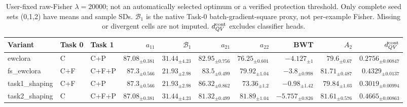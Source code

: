 \begin{table}[t]
\centering
\begin{tabular}{lllrrrrrrr}
\hline
Variant & Task 0 & Task 1 & $a_{11}$ & $\mathcal B_1$ & $a_{21}$ & $a_{22}$ & BWT & $A_2$ & $d_{QV}^{\rm cont}$ \\
\hline
ewclora & C & C+P & $87.08_{\pm 0.381}$ & $31.44_{\pm 4.23}$ & $82.95_{\pm 0.756}$ & $76.25_{\pm 0.601}$ & $-4.127_{\pm 1}$ & $79.6_{\pm 0.67}$ & $0.2756_{\pm 0.00847}$ \\
fs\_ewclora & C+F & C+F+P & $87.3_{\pm 0.566}$ & $21.93_{\pm 2.98}$ & $83.5_{\pm 0.499}$ & $79.92_{\pm 1.04}$ & $-3.8_{\pm 0.998}$ & $81.71_{\pm 0.487}$ & $0.4329_{\pm 0.0137}$ \\
task1\_shaping & C+F & C+P & $87.3_{\pm 0.566}$ & $21.93_{\pm 2.98}$ & $86.32_{\pm 0.862}$ & $73.36_{\pm 1.2}$ & $-0.98_{\pm 1.42}$ & $79.84_{\pm 1.03}$ & $0.3019_{\pm 0.00994}$ \\
task2\_shaping & C & C+F+P & $87.08_{\pm 0.381}$ & $31.44_{\pm 4.23}$ & $81.32_{\pm 0.499}$ & $81.89_{\pm 1.04}$ & $-5.757_{\pm 0.826}$ & $81.61_{\pm 0.576}$ & $0.4665_{\pm 0.00863}$ \\
\hline
\end{tabular}
\caption{User-fixed raw-Fisher $\lambda=20000$; not an automatically selected optimum or a verified protection threshold. Only complete seed sets (0,1,2) have means and sample SDs. $\mathcal B_1$ is the native Task-0 batch-gradient-square proxy, not per-example Fisher. Missing or divergent cells are not imputed. $d_{QV}^{\rm cont}$ excludes classifier heads.}
\end{table}
